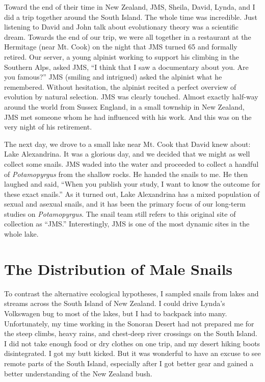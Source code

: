 \documentclass[
  american,
  letterpaper,
]{book}
\begin{document}
Toward the end of their time in New Zealand, JMS, Sheila, David, Lynda,
and I did a trip together around the South Island. The whole time was
incredible. Just listening to David and John talk about evolutionary
theory was a scientific dream. Towards the end of our trip, we were all
together in a restaurant at the Hermitage (near Mt. Cook) on the night
that JMS turned 65 and formally retired. Our server, a young alpinist
working to support his climbing in the Southern Alps, asked JMS, ``I
think that I saw a documentary about you. Are you famous?'' JMS (smiling
and intrigued) asked the alpinist what he remembered. Without
hesitation, the alpinist recited a perfect overview of evolution by
natural selection. JMS was clearly touched. Almost exactly half-way
around the world from Sussex England, in a small township in New
Zealand, JMS met someone whom he had influenced with his work. And this
was on the very night of his retirement.

The next day, we drove to a small lake near Mt. Cook that David knew
about: Lake Alexandrina. It was a glorious day, and we decided that we
might as well collect some snails. JMS waded into the water and
proceeded to collect a handful of \emph{Potamopyrgus} from the shallow
rocks. He handed the snails to me. He then laughed and said, ``When you
publish your study, I want to know the outcome for these exact snails.''
As it turned out, Lake Alexandrina has a mixed population of sexual and
asexual snails, and it has been the primary focus of our long-term
studies on \emph{Potamopyrgus}. The snail team still refers to this
original site of collection as ``JMS.'' Interestingly, JMS is one of the
most dynamic sites in the whole lake.

\section{The Distribution of Male
Snails}\label{the-distribution-of-male-snails}

To contrast the alternative ecological hypotheses, I sampled snails from
lakes and streams across the South Island of New Zealand. I could drive
Lynda's Volkswagen bug to most of the lakes, but I had to backpack into
many. Unfortunately, my time working in the Sonoran Desert had not
prepared me for the steep climbs, heavy rains, and chest-deep river
crossings on the South Island. I did not take enough food or dry clothes
on one trip, and my desert hiking boots disintegrated. I got my butt
kicked. But it was wonderful to have an excuse to see remote parts of
the South Island, especially after I got better gear and gained a better
understanding of the New Zealand bush.
\end{document}
